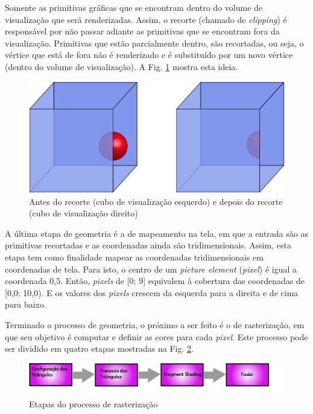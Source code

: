 	Somente as primitivas gráficas que se encontram dentro do volume de visualização que serã renderizadas. Assim, o recorte (chamado de \textit{clipping}) é responsável por não passar adiante as primitivas que se encontram fora da visualização. Primitivas que estão parcialmente dentro, são recortadas, ou seja, o vértice que está de fora não é renderizado e é substituído por um novo vértice (dentro do volume de visualização). A  Fig. \ref{clip} mostra esta ideia.

       \begin{figure}[h]
       \centering
	\includegraphics[keepaspectratio=true,scale=0.8]{figuras/clip.jpg}
       \caption{Antes do recorte (cubo de visualização esquerdo) e depois do recorte (cubo de visualização direito)}
       \label{clip}
       \end{figure}


	A última etapa de geometria é a de mapeamento na tela, em que a entrada são as primitivas recortadas e as coordenadas ainda são tridimensionais. Assim, esta etapa tem como finalidade mapear as coordenadas tridimensionais em coordenadas de tela. Para isto, o centro de um \textit{picture element} (\textit{pixel}) é igual a coordenada 0,5. Então, \textit{pixels} de [0; 9] equivalem à cobertura das coordenadas de [0,0; 10,0). E os valores dos \textit{pixels} crescem da esquerda para a direita e de cima para baixo.

	Terminado o processo de geometria, o próximo a ser feito é o de rasterização, em que seu objetivo é computar e definir as cores para cada \textit{pixel}. Este processo pode ser dividido em quatro etapas mostradas na Fig. \ref{rasteriza}.

   \begin{figure}[h]
       \centering
	\includegraphics[keepaspectratio=true,scale=0.8]{figuras/rasteriza.jpg}
       \caption{Etapas do processo de rasterização}
       \label{rasteriza}
       \end{figure}

